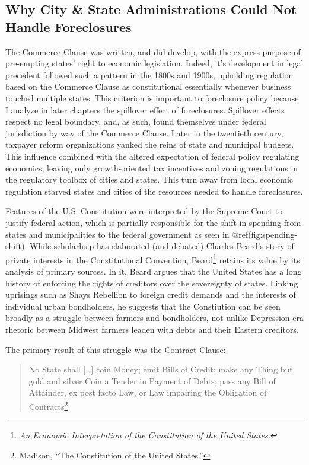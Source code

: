 \documentclass[
]{article}
\let\rmarkdownfootnote\footnote%
\def\footnote{\protect\rmarkdownfootnote}
\begin{document}
\hypertarget{cities-states}{%
\subsection{Why City \& State Administrations Could Not Handle
Foreclosures}\label{cities-states}}

The Commerce Clause was written, and did develop, with the express
purpose of pre-empting states' right to economic legislation. Indeed,
it's development in legal precedent followed such a pattern in the 1800s
and 1900s, upholding regulation based on the Commerce Clause as
constitutional essentially whenever business touched multiple states.
This criterion is important to foreclosure policy because I analyze in
later chapters the spillover effect of foreclosures. Spillover effects
respect no legal boundary, and, as such, found themselves under federal
jurisdiction by way of the Commerce Clause. Later in the twentieth
century, taxpayer reform organizations yanked the reins of state and
municipal budgets. This influence combined with the altered expectation
of federal policy regulating economics, leaving only growth-oriented tax
incentives and zoning regulations in the regulatory toolbox of cities
and states. This turn away from local economic regulation starved states
and cities of the resources needed to handle foreclosures.

Features of the U.S. Constitution were interpreted by the Supreme Court
to justify federal action, which is partially responsible for the shift
in spending from states and municipalities to the federal government as
seen in @ref(fig:spending-shift). While scholarhsip has elaborated (and
debated) Charles Beard's story of private interests in the
Constitutional Convention, Beard\footnote{\emph{An Economic
  Interpretation of the Constitution of the United States.}} retains its
value by its analysis of primary sources. In it, Beard argues that the
United States has a long history of enforcing the rights of creditors
over the sovereignty of states. Linking uprisings such as Shays
Rebellion to foreign credit demands and the interests of individual
urban bondholders, he suggests that the Constiution can be seen broadly
as a struggle between farmers and bondholders, not unlike Depression-era
rhetoric between Midwest farmers leaden with debts and their Eastern
creditors.

The primary result of this struggle was the Contract Clause:

\begin{quote}
No State shall {[}\ldots{]} coin Money; emit Bills of Credit; make any
Thing but gold and silver Coin a Tender in Payment of Debts; pass any
Bill of Attainder, ex post facto Law, or Law impairing the Obligation of
Contracts\footnote{Madison, ``The Constitution of the United States.''}
\end{quote}
\end{document}
